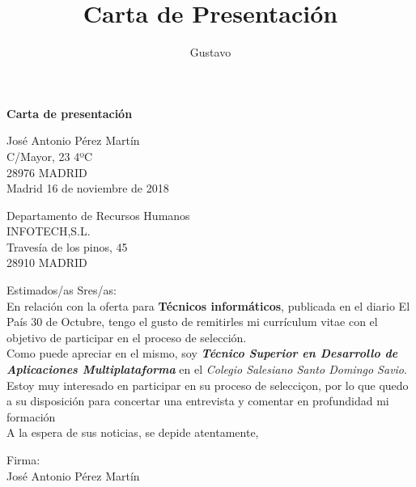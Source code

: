 \documentclass[10pt,a4paper]{article}
\author{Gustavo}
\title{Carta de Presentación}
\begin{document}
	\begin{center}
		\smallskip
			\Large 
			{\bf Carta de presentación}
	\end{center}
	\begin{flushright}
		José Antonio Pérez Martín\\
		C/Mayor, 23 4ºC\\
		28976 MADRID\\
	 	\vspace{0,2cm}
		Madrid 16 de noviembre de 2018
		
	\end{flushright}

	\begin{flushleft}
		Departamento de Recursos Humanos\\
		INFOTECH,S.L.\\
		Travesía de los pinos, 45\\
		28910 MADRID\\
	\end{flushleft}

Estimados/as Sres/as:\\

En relación con la oferta para {\bf Técnicos informáticos}, publicada en el diario El País 30 de Octubre, tengo el gusto de remitirles mi currículum vitae con el objetivo de participar en el proceso de selección.\\

Como puede apreciar en el mismo, soy {\bf \em Técnico Superior en Desarrollo de Aplicaciones Multiplataforma} en el {\em Colegio Salesiano Santo Domingo Savio}.\\

Estoy muy interesado en participar en su proceso de selecciçon, por lo que quedo a su disposición para concertar una entrevista y comentar en profundidad mi formación\\

A la espera de sus noticias, se depide atentamente,\\
	\begin{center}
		Firma:\\
			 \vspace{2cm}
		José Antonio Pérez Martín
	\end{center}
\end{document}
